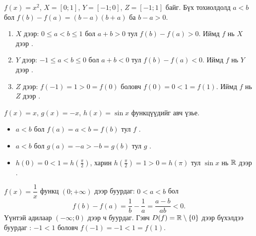 \begin{example}
$f(x)=x^2$, \; $X=[0;1]$, \; $Y=[-1;0]$, \; $Z=[-1;1]$ байг. Бүх тохиолдолд
$a<b$ бол $f(b)-f(a)=(b-a)(b+a)$ ба $b-a>0$.
\begin{enumerate}
  \item $X$ дээр: $0\le a<b\le1$ бол $a+b>0$ тул $f(b)-f(a)>0$. Иймд $f$ нь $X$ дээр .
  \item $Y$ дээр: $-1\le a<b\le0$ бол $a+b<0$ тул $f(b)-f(a)<0$. Иймд $f$ нь $Y$ дээр .
  \item $Z$ дээр: $f(-1)=1>0=f(0)$ боловч $f(0)=0<1=f(1)$. Иймд $f$ нь $Z$ дээр .
\end{enumerate}
\end{example}

\begin{example}
$f(x)=x$, $g(x)=-x$, $h(x)=\sin x$ функцүүдийг авч үзье.
\begin{itemize}
  \item $a<b$ бол $f(a)=a<b=f(b)$ тул $f$ .
  \item $a<b$ бол $g(a)=-a>-b=g(b)$ тул $g$ .
  \item $h(0)=0<1=h\!\left(\tfrac{\pi}{2}\right)$, харин $h\!\left(\tfrac{\pi}{2}\right)=1>0=h(\pi)$
        тул $\sin x$ нь $\mathbb{R}$ дээр .
\end{itemize}
\begin{center}
\end{center}
\end{example}

\begin{example}[Анхаар!]
$f(x)=\dfrac1x$ функц $(0;+\infty)$ дээр буурдаг: $0<a<b$ бол
\[
f(b)-f(a)=\frac1b-\frac1a=\frac{a-b}{ab}<0.
\]
Үүнтэй адилаар $(-\infty;0)$ дээр ч буурдаг. Гэвч $D(f)=\mathbb{R}\setminus\{0\}$ дээр бүхэлдээ
буурдаг : $-1<1$ боловч $f(-1)=-1<1=f(1)$.
\end{example}

